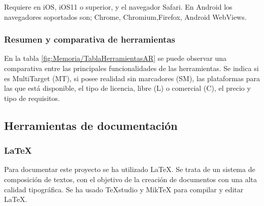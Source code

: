 Requiere en iOS, iOS11 o superior, y el navegador Safari. En Android los navegadores soportados son; Chrome, Chromium,Firefox, Android WebViews.

\subsubsection{Resumen y comparativa de herramientas}
En la tabla \ref{fig:Memoria/TablaHerramientasAR} se puede observar una comparativa entre las principales funcionalidades de las herramientas. Se indica si es MultiTarget (MT), si posee realidad sin marcadores (SM), las plataformas para las que está disponible, el tipo de licencia, libre (L) o comercial (C), el precio y tipo de requisitos.







\subsection{Herramientas de documentación}
\subsubsection{\LaTeX} 
Para documentar este proyecto se ha utilizado \LaTeX. Se trata de un sistema de composición de textos, con el objetivo de la creación de documentos con una alta calidad tipográfica. Se ha usado TeXstudio y Mik\TeX{} para compilar y editar \LaTeX.


